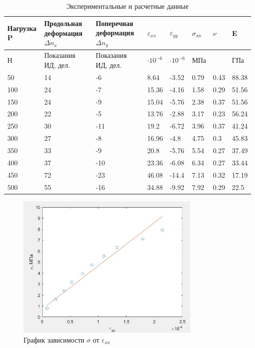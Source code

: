 \documentclass[12pt, a4paper]{article}
\begin{document}
\begin{table}[h]
\centering
\begin{tabular}{|m{2cm}|m{2.5cm}|m{2.5cm}|m{1.5cm}|m{1.5cm}|m{1.5cm}|m{1.5cm}|m{1.5cm}|}
\hline
Нагрузка P &Продольная  деформация $ \Delta n_{x}$& Поперечная  деформация $\Delta n_{y}$& $\varepsilon_{xx}$ &
$\varepsilon_{yy}$ & $\sigma_{xx}$ & $\nu $& E \\

\hline
Н & Показания ИД, дел. & Показания ИД, дел. & $\cdot 10^{-6} $ & $\cdot 10^{-6} $ &МПа& &ГПа \\
\hline
50&14&-6&8.64&-3.52&0.79&0.43&88.38\\

100&24&-7&15.36&-4.16&1.58&0.29&51.56\\

150&24&-9&15.04&-5.76&2.38&0.37&51.56\\

200&22&-5&13.76&-2.88&3.17&0.23&56.24\\

250&30&-11&19.2&-6.72&3.96&0.37&41.24\\

300 & 27 & -8 & 16.96 & -4.8 & 4.75 & 0.3 & 45.83\\

350&33&-9&20.8&-5.76&5.54&0.27&37.49\\

400&37&-10&23.36&-6.08&6.34&0.27&33.44\\

450&72&-23&46.08&-14.4&7.13&0.32&17.19\\

500 & 55 & -16 & 34.88 &-9.92 &7.92 & 0.29 & 22.5\\
\hline


\end{tabular}
\caption{Экспериментальные и расчетные данные}
\label{tb1}
 \end{table}
 \begin{figure}[h]
        \centering
        \includegraphics[width = 9cm]{Lab2_4.jpg}
        \caption{График зависимости $\sigma$ от $\varepsilon_{xx}$}
        \label{im2}
    \end{figure}
\end{document}
